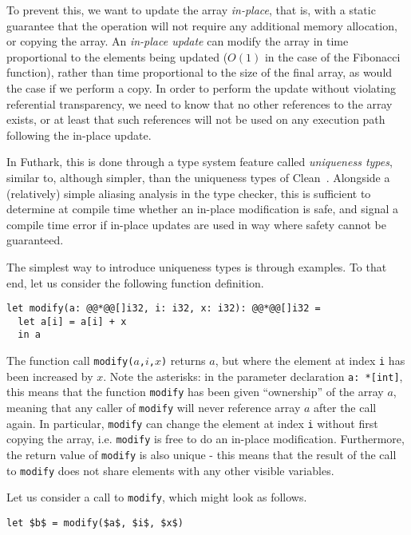 \documentclass[oneside,11pt]{book}
\begin{document}
To prevent this, we want to update the array \textit{in-place}, that
is, with a static guarantee that the operation will not require any
additional memory allocation, or copying the array.  An
\textit{in-place update} can modify the array in time proportional to
the elements being updated ($O(1)$ in the case of the Fibonacci
function), rather than time proportional to the size of the final
array, as would the case if we perform a copy.  In order to perform
the update without violating referential transparency, we need to know
that no other references to the array exists, or at least that such
references will not be used on any execution path following the
in-place update.

In Futhark, this is done through a type system feature called
\textit{uniqueness types}, similar to, although simpler, than the
uniqueness types of
Clean~\cite{clean-uniqueness-types,barendsen1996uniqueness}.
Alongside a (relatively) simple aliasing analysis in the type checker,
this is sufficient to determine at compile time whether an in-place
modification is safe, and signal a compile time error if in-place
updates are used in way where safety cannot be guaranteed.

The simplest way to introduce uniqueness types is through examples.
To that end, let us consider the following function definition.

\begin{lstlisting}
let modify(a: @@*@@[]i32, i: i32, x: i32): @@*@@[]i32 =
  let a[i] = a[i] + x
  in a
\end{lstlisting}

The function call \texttt{modify($a$,$i$,$x$)} returns $a$, but where
the element at index \texttt{i} has been increased by $x$.  Note the
asterisks: in the parameter declaration \texttt{a: *[int]}, this means
that the function \texttt{modify} has been given ``ownership'' of the
array $a$, meaning that any caller of \texttt{modify} will never
reference array $a$ after the call again.  In particular,
\texttt{modify} can change the element at index \texttt{i} without
first copying the array, i.e. \texttt{modify} is free to do an
in-place modification.  Furthermore, the return value of
\texttt{modify} is also unique - this means that the result of the
call to \texttt{modify} does not share elements with any other visible
variables.

Let us consider a call to \texttt{modify}, which might look as
follows.

\begin{lstlisting}[mathescape=true]
let $b$ = modify($a$, $i$, $x$)
\end{lstlisting}
\end{document}
